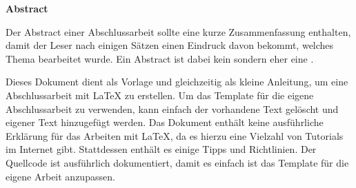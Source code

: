 \cleardoublepage
\newpage
\begin{minipage}[0.95\textheight]{0.95\textwidth}
\large
\textbf{Abstract}\par
\vspace{\baselineskip}
\small
    
Der Abstract einer Abschlussarbeit sollte eine kurze Zusammenfassung enthalten, damit der Leser nach einigen Sätzen einen Eindruck davon bekommt, welches Thema bearbeitet wurde.
Ein Abstract ist dabei kein  sondern eher eine .

Dieses Dokument dient als Vorlage und gleichzeitig als kleine Anleitung, um eine Abschlussarbeit mit \LaTeX{} zu erstellen. Um das Template für die eigene Abschlussarbeit zu verwenden, kann einfach der vorhandene Text gelöscht und eigener Text hinzugefügt werden. Das Dokument enthält keine ausführliche Erklärung für das Arbeiten mit \LaTeX{}, da es hierzu eine Vielzahl von Tutorials im Internet gibt. Stattdessen enthält es einige Tipps und Richtlinien. Der Quellcode ist ausführlich dokumentiert, damit es einfach ist das Template für die eigene Arbeit anzupassen.


\end{minipage}
